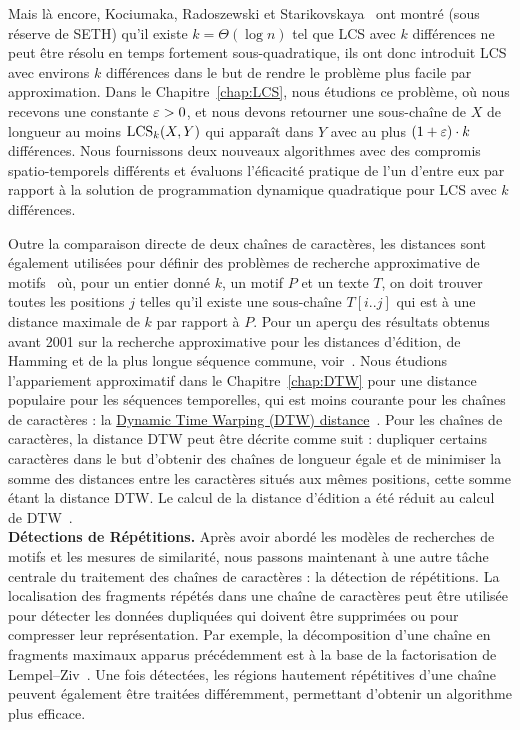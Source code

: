 Mais là encore, Kociumaka, Radoszewski et Starikovskaya~\cite{DBLP:journals/algorithmica/KociumakaRS19} ont montré (sous réserve de SETH) qu'il existe $k=\Theta(\log n)$ tel que LCS avec $k$ différences ne peut être résolu en temps fortement sous-quadratique, ils ont donc introduit LCS avec environs $k$ différences dans le but de rendre le problème plus facile par approximation.
Dans le Chapitre~\ref{chap:LCS}, nous étudions ce problème, où nous recevons une constante $\varepsilon > 0$, et nous devons retourner une sous-chaîne de $X$ de longueur au moins $\mathrm{LCS}_{k}(X,Y)$ qui apparaît dans $Y$ avec au plus $(1+\varepsilon) \cdot k$ différences. Nous fournissons deux nouveaux algorithmes avec des compromis spatio-temporels différents et évaluons l'éficacité pratique de l'un d'entre eux par rapport à la solution de programmation dynamique quadratique pour LCS avec $k$ différences.


Outre la comparaison directe de deux chaînes de caractères, les distances sont également utilisées pour définir des problèmes de recherche approximative de motifs~\cite{landau1986efficient,landau1989fast} où, pour un entier donné $k$, un motif $P$ et un texte $T$, on doit trouver toutes les positions $j$ telles qu'il existe une sous-chaîne $T[i..j]$ qui est à une distance maximale de $k$ par rapport à $P$.
Pour un aperçu des résultats obtenus avant 2001 sur la recherche approximative pour les distances d'édition, de Hamming et de la plus longue séquence commune, voir~\cite{navarro2001guided}.
Nous étudions l'appariement approximatif dans le Chapitre~\ref{chap:DTW} pour une distance populaire pour les séquences temporelles, qui est moins courante pour les chaînes de caractères : la \underline{Dynamic Time Warping (DTW) distance}~\cite{sakoe1978dynamic}. Pour les chaînes de caractères, la distance DTW peut être décrite comme suit : dupliquer certains caractères dans le but d'obtenir des chaînes de longueur égale et de minimiser la somme des distances entre les caractères situés aux mêmes positions, cette somme étant la distance DTW. Le calcul de la distance d'édition a été réduit au calcul de DTW~\cite{DBLP:conf/icalp/Kuszmaul19}.\\


\noindent\textbf{Détections de Répétitions.} Après avoir abordé les modèles de recherches de motifs et les mesures de similarité, nous passons maintenant à une autre tâche centrale du traitement des chaînes de caractères : la détection de répétitions. La localisation des fragments répétés dans une chaîne de caractères peut être utilisée pour détecter les données dupliquées qui doivent être supprimées ou pour compresser leur représentation. Par exemple, la décomposition d'une chaîne en fragments maximaux apparus précédemment est à la base de la factorisation de Lempel--Ziv~\cite{ziv1977universal}. Une fois détectées, les régions hautement répétitives d'une chaîne peuvent également être traitées différemment, permettant d'obtenir un algorithme plus efficace.

